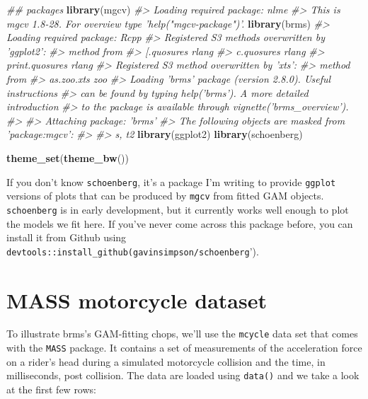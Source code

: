 \documentclass[]{book}
\newenvironment{Shaded}{\begin{snugshade}}{\end{snugshade}}
\newcommand{\CommentTok}[1]{\textcolor[rgb]{0.56,0.35,0.01}{\textit{#1}}}
\newcommand{\KeywordTok}[1]{\textcolor[rgb]{0.13,0.29,0.53}{\textbf{#1}}}
\newcommand{\NormalTok}[1]{#1}
\begin{document}
\begin{Shaded}
\begin{Highlighting}[]
\CommentTok{## packages}
\KeywordTok{library}\NormalTok{(mgcv)}
\CommentTok{#> Loading required package: nlme}
\CommentTok{#> This is mgcv 1.8-28. For overview type 'help("mgcv-package")'.}
\KeywordTok{library}\NormalTok{(brms)}
\CommentTok{#> Loading required package: Rcpp}
\CommentTok{#> Registered S3 methods overwritten by 'ggplot2':}
\CommentTok{#>   method         from }
\CommentTok{#>   [.quosures     rlang}
\CommentTok{#>   c.quosures     rlang}
\CommentTok{#>   print.quosures rlang}
\CommentTok{#> Registered S3 method overwritten by 'xts':}
\CommentTok{#>   method     from}
\CommentTok{#>   as.zoo.xts zoo}
\CommentTok{#> Loading 'brms' package (version 2.8.0). Useful instructions}
\CommentTok{#> can be found by typing help('brms'). A more detailed introduction}
\CommentTok{#> to the package is available through vignette('brms_overview').}
\CommentTok{#> }
\CommentTok{#> Attaching package: 'brms'}
\CommentTok{#> The following objects are masked from 'package:mgcv':}
\CommentTok{#> }
\CommentTok{#>     s, t2}
\KeywordTok{library}\NormalTok{(ggplot2)}
\KeywordTok{library}\NormalTok{(schoenberg)}

\KeywordTok{theme_set}\NormalTok{(}\KeywordTok{theme_bw}\NormalTok{())}
\end{Highlighting}
\end{Shaded}

If you don't know \texttt{schoenberg}, it's a package I'm writing to provide \texttt{ggplot} versions of plots that can be produced by \texttt{mgcv} from fitted GAM objects. \texttt{schoenberg} is in early development, but it currently works well enough to plot the models we fit here. If you've never come across this package before, you can install it from Github using \texttt{devtools::install\_github(\textquotesingle{}gavinsimpson/schoenberg}').

\hypertarget{mass-motorcycle-dataset}{%
\section{MASS motorcycle dataset}\label{mass-motorcycle-dataset}}

To illustrate brms's GAM-fitting chops, we'll use the \texttt{mcycle} data set that comes with the \texttt{MASS} package. It contains a set of measurements of the acceleration force on a rider's head during a simulated motorcycle collision and the time, in milliseconds, post collision. The data are loaded using \texttt{data()} and we take a look at the first few rows:
\end{document}
